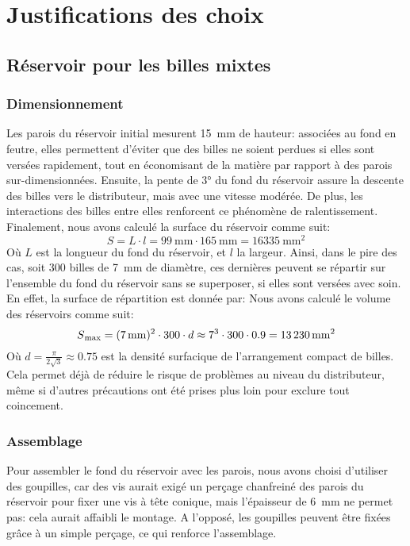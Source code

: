 \chapter{Justifications des choix}

\section{Réservoir pour les billes mixtes}

\subsection{Dimensionnement}
Les parois du réservoir initial mesurent \SI{15}{\milli\metre} de hauteur: associées au fond en feutre, elles permettent d'éviter que des billes ne soient perdues si elles sont versées rapidement, tout en économisant de la matière par rapport à des parois sur-dimensionnées. 
Ensuite, la pente de \ang{3} du fond du réservoir assure la descente des billes vers le distributeur, mais avec une vitesse modérée. De plus, les interactions des billes entre elles renforcent ce phénomène de ralentissement.
Finalement, nous avons calculé la surface du réservoir comme suit:
\[S = L \cdot l = \SI{99}{\milli\metre} \cdot \SI{165}{\milli\metre} = \SI{16335}{\milli\metre\squared}\]
Où $L$ est la longueur du fond du réservoir, et $l$ la largeur.
Ainsi, dans le pire des cas, soit \num{300} billes de \SI{7}{\milli\metre} de diamètre, ces dernières peuvent se répartir sur l'ensemble du fond du réservoir sans se superposer, si elles sont versées avec soin. En effet, la surface de répartition est donnée par:
 Nous avons calculé le volume des réservoirs comme suit:
\[S\textsubscript{max} = (\SI{7}{\milli\metre})^{2} \cdot \num{300} \cdot d \approx {\num{7}}^{3} \cdot 300 \cdot 0.9 = \SI{13230}{\milli\metre\squared}\]
Où \(d = \frac{ \pi }{2\sqrt{3}} \approx \num{0.75}\) est la densité surfacique de l'arrangement compact de billes.
Cela permet déjà de réduire le risque de problèmes au niveau du distributeur, même si d'autres précautions ont été prises plus loin pour exclure tout coincement.

\subsection{Assemblage}
Pour assembler le fond du réservoir avec les parois, nous avons choisi d'utiliser des goupilles, car des vis aurait exigé un perçage chanfreiné des parois du réservoir pour fixer une vis à tête conique, mais l'épaisseur de \SI{6}{\milli\metre} ne permet pas: cela aurait affaibli le montage. A l'opposé, les goupilles peuvent être fixées grâce à un simple perçage, ce qui renforce l'assemblage.

